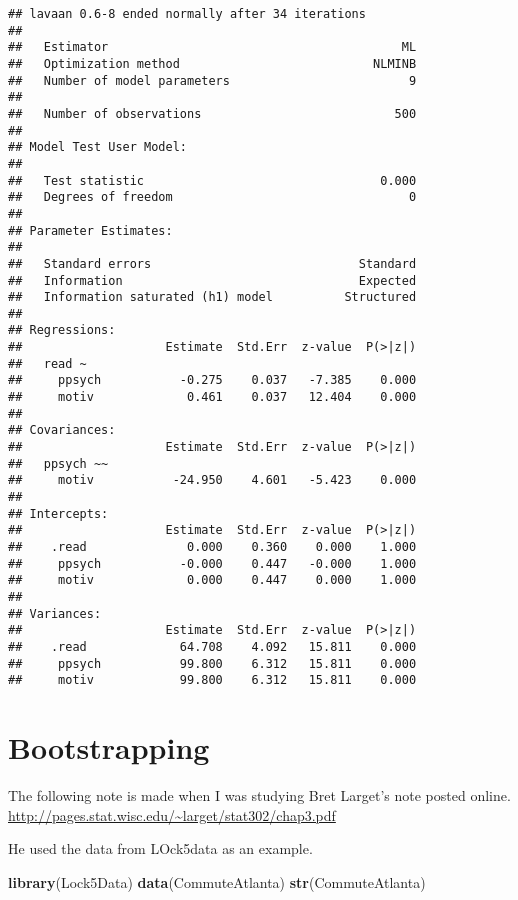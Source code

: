 \documentclass[]{book}
\newenvironment{Shaded}{\begin{snugshade}}{\end{snugshade}}
\newcommand{\KeywordTok}[1]{\textcolor[rgb]{0.13,0.29,0.53}{\textbf{#1}}}
\newcommand{\NormalTok}[1]{#1}
\begin{document}
\begin{verbatim}
## lavaan 0.6-8 ended normally after 34 iterations
## 
##   Estimator                                         ML
##   Optimization method                           NLMINB
##   Number of model parameters                         9
##                                                       
##   Number of observations                           500
##                                                       
## Model Test User Model:
##                                                       
##   Test statistic                                 0.000
##   Degrees of freedom                                 0
## 
## Parameter Estimates:
## 
##   Standard errors                             Standard
##   Information                                 Expected
##   Information saturated (h1) model          Structured
## 
## Regressions:
##                    Estimate  Std.Err  z-value  P(>|z|)
##   read ~                                              
##     ppsych           -0.275    0.037   -7.385    0.000
##     motiv             0.461    0.037   12.404    0.000
## 
## Covariances:
##                    Estimate  Std.Err  z-value  P(>|z|)
##   ppsych ~~                                           
##     motiv           -24.950    4.601   -5.423    0.000
## 
## Intercepts:
##                    Estimate  Std.Err  z-value  P(>|z|)
##    .read              0.000    0.360    0.000    1.000
##     ppsych           -0.000    0.447   -0.000    1.000
##     motiv             0.000    0.447    0.000    1.000
## 
## Variances:
##                    Estimate  Std.Err  z-value  P(>|z|)
##    .read             64.708    4.092   15.811    0.000
##     ppsych           99.800    6.312   15.811    0.000
##     motiv            99.800    6.312   15.811    0.000
\end{verbatim}

\hypertarget{bootstrapping}{%
\chapter{Bootstrapping}\label{bootstrapping}}

The following note is made when I was studying Bret Larget's note posted online.
\url{http://pages.stat.wisc.edu/~larget/stat302/chap3.pdf}

He used the data from LOck5data as an example.

\begin{Shaded}
\begin{Highlighting}[]
\KeywordTok{library}\NormalTok{(Lock5Data)}
\KeywordTok{data}\NormalTok{(CommuteAtlanta)}
\KeywordTok{str}\NormalTok{(CommuteAtlanta)}
\end{Highlighting}
\end{Shaded}
\end{document}
